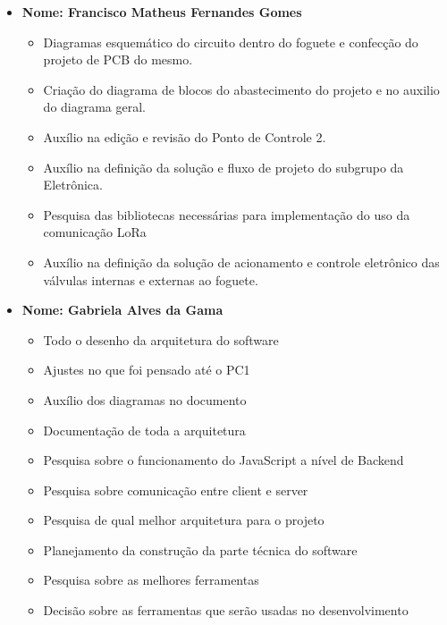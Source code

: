 \begin{itemize}
    
    \item \textbf{Nome: Francisco Matheus Fernandes Gomes}
    \begin{itemize}
     \item Diagramas esquemático do circuito dentro do foguete e confecção do projeto de PCB do mesmo.
    \item Criação do diagrama de blocos do abastecimento do projeto e no auxilio do diagrama geral.
    \item Auxílio na edição e revisão do Ponto de Controle 2.
    \item Auxílio na definição da solução e fluxo de projeto do subgrupo da Eletrônica.
   \item Pesquisa das bibliotecas necessárias para implementação do uso da comunicação LoRa
   \item Auxílio na definição da solução de acionamento e controle eletrônico das válvulas internas e externas ao foguete.
    \end{itemize}
    
    
    
    \item \textbf{Nome: Gabriela Alves da Gama}
    \begin{itemize}
    \item Todo o desenho da arquitetura do software
    \item Ajustes no que foi pensado até o PC1
    \item Auxílio dos diagramas no documento
    \item Documentação de toda a arquitetura
    \item Pesquisa sobre o funcionamento do JavaScript a nível de Backend
    \item Pesquisa sobre comunicação entre client e server
    \item Pesquisa de qual melhor arquitetura para o projeto
    \item Planejamento da construção da parte técnica do software
    \item Pesquisa sobre as melhores ferramentas
    \item Decisão sobre as ferramentas que serão usadas no desenvolvimento
    \end{itemize}


\end{itemize}
